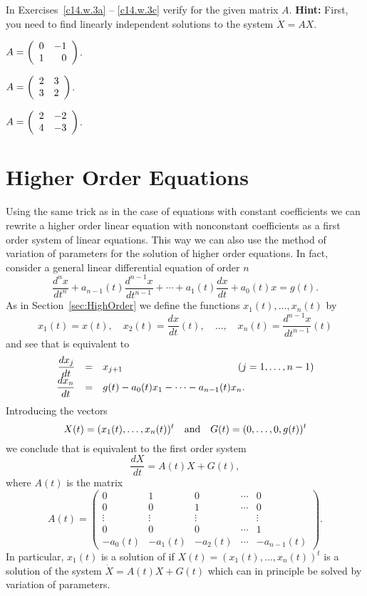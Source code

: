 \documentclass{ximera}
\begin{document}
\noindent In Exercises~\ref{c14.w.3a} -- \ref{c14.w.3c} verify  
for the given matrix $A$.  {\bf Hint:} First, you need to find linearly 
independent solutions to the system $\dot{X}=AX$.
\begin{exercise} 	\label{c14.w.3a}
$A = \left(\begin{array}{rr} 0 & -1\\ 1 &0\end{array}\right)$.
\end{exercise}
\begin{exercise} 	\label{c14.w.3b}
$A = \left(\begin{array}{rr} 2 & 3\\ 3 &2\end{array}\right)$.
\end{exercise}
\begin{exercise} 	\label{c14.w.3c}
$A = \left(\begin{array}{rr} 2 & -2\\ 4 &-3\end{array}\right)$.
\end{exercise}

 


\section{Higher Order Equations}
\label{S:RO}

Using the same trick as in the case of equations with constant 
coefficients we can rewrite a higher order linear equation with
nonconstant coefficients as a first order system of linear
equations.  This way we can also use the method of variation 
of parameters for the solution of higher order equations.  
In fact, consider a general linear differential equation of 
order $n$
\begin{equation}
\label{E:noncc}
\frac{d^nx}{dt^n} + a_{n-1}(t)\frac{d^{n-1}x}{dt^{n-1}} +\cdots + 
a_1(t)\frac{dx}{dt}+a_0(t)x = g(t).
\end{equation}
As in Section~\ref{sec:HighOrder} we define the functions
$x_1(t),\ldots,x_n(t)$ by
\[
x_1(t)=x(t),\quad x_2(t)=\frac{dx}{dt}(t),\quad
\ldots, \quad  x_n(t)=\frac{d^{n-1}x}{dt^{n-1}}(t)
\]
and see that  is equivalent to
\arraystart
\[
\begin{array}{rcl}
\displaystyle \frac{dx_j}{dt}&=&x_{j+1} \hspace{1.6in} (j=1,\ldots,n-1)\\
\displaystyle \frac{dx_n}{dt}&=& g(t) - a_0(t)x_1 - \cdots - a_{n-1}(t) x_n.
\end{array}
\]
\arrayfinish
Introducing the vectors
\[
X(t) = (x_1(t),\ldots,x_n(t))^t  \quad\mbox{and}\quad
G(t) = (0,\ldots,0,g(t))^t
\]
we conclude that  is equivalent to the 
first order system
\[
\frac{dX}{dt} = A(t)X+G(t),
\]
where $A(t)$ is the matrix
\[
A(t) = \left(\begin{array}{ccccc}
0 & 1 & 0 & \cdots & 0\\
0 & 0 & 1 & \cdots & 0\\
\vdots & \vdots & \vdots & & \vdots\\
0 & 0 & 0 & \cdots & 1\\
-a_0(t) & -a_1(t) &  -a_2(t) & \cdots & -a_{n-1}(t)
\end{array}\right).
\]
In particular, $x_1(t)$ is a solution of  if 
$X(t)=(x_1(t),\ldots,x_n(t))^t$ is a solution of the system
$\dot X = A(t)X+G(t)$ which can in principle be solved by
variation of parameters.
\end{document}
